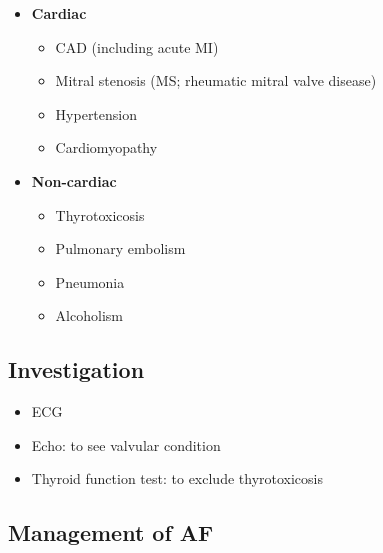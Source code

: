 \documentclass[
  12pt,
]{memoir}
\providecommand{\tightlist}{%
  \setlength{\itemsep}{0pt}\setlength{\parskip}{0pt}}
\begin{document}
\begin{itemize}
\tightlist
\item
  \textbf{Cardiac}

  \begin{itemize}
  \tightlist
  \item
    CAD (including acute MI)
  \item
    Mitral stenosis (MS; rheumatic mitral valve disease)
  \item
    Hypertension
  \item
    Cardiomyopathy
  \end{itemize}
\item
  \textbf{Non-cardiac}

  \begin{itemize}
  \tightlist
  \item
    Thyrotoxicosis
  \item
    Pulmonary embolism
  \item
    Pneumonia
  \item
    Alcoholism
  \end{itemize}
\end{itemize}

\hypertarget{investigation}{%
\subsection{Investigation}\label{investigation}}

\begin{itemize}
\tightlist
\item
  ECG
\item
  Echo: to see valvular condition
\item
  Thyroid function test: to exclude thyrotoxicosis
\end{itemize}

\hypertarget{management-of-af}{%
\subsection{Management of AF}\label{management-of-af}}
\end{document}
